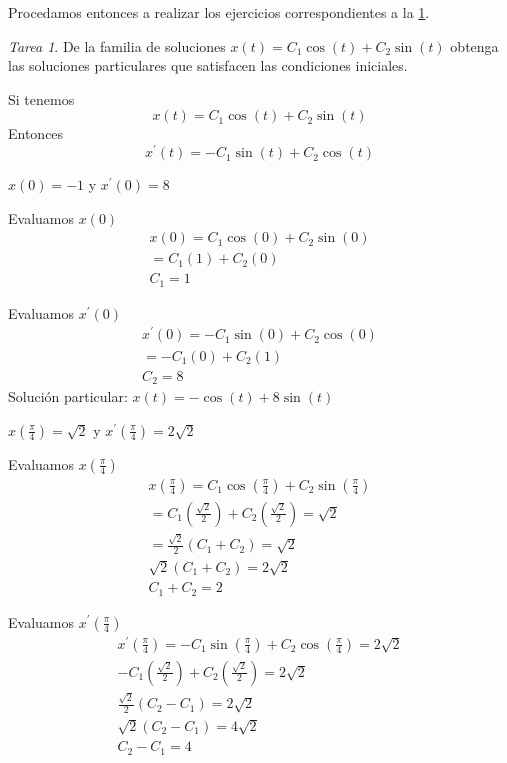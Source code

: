 \documentclass[12pt]{article} %
\theoremstyle{remark} %
\newtheorem{tarea}{Tarea}[section] %
\newcounter{ejercicio}[tarea]
\begin{document}
Procedamos entonces a realizar los ejercicios correspondientes a la \cref{tarea:familiaSoluciones}.
\begin{tarea}\label{tarea:familiaSoluciones}
De la familia de soluciones $x(t) = C_1 \cos(t) + C_2 \sin(t)$ obtenga las 
soluciones particulares que satisfacen las condiciones iniciales.

Si tenemos \[ x(t) = C_1 \cos(t) + C_2 \sin(t) \]
Entonces \[ x^{\prime}(t) = -C_1 \sin(t) + C_2 \cos(t) \]
\begin{ejercicio}
  $x(0) = -1$ y $x^{\prime}(0) = 8$

  Evaluamos $x(0)$
  \begin{gather*}
    x(0) = C_1 \cos(0) + C_2 \sin(0)\\
    = C_1(1) + C_2(0)\\
    C_1  = 1
  \end{gather*}

  Evaluamos $x^{\prime}(0)$
  \begin{gather*}
    x^{\prime}(0) = -C_1 \sin(0) + C_2 \cos(0)\\
    = -C_1(0) + C_2(1)\\
    C_2 = 8
  \end{gather*}
  Solución particular: $x(t) = - \cos(t) + 8 \sin(t)$

\end{ejercicio}
\begin{ejercicio}
  $x(\frac{\pi}{4}) = \sqrt{2}$ y $x^{\prime}(\frac{\pi}{4}) = 2 \sqrt{2}$

  Evaluamos $x(\frac{\pi}{4})$
  \begin{gather*}
    x(\frac{\pi}{4}) = C_1 \cos(\frac{\pi}{4}) + C_2 \sin(\frac{\pi}{4})\\
    = C_1 (\frac{\sqrt{2}}{2}) + C_2 (\frac{\sqrt{2}}{2}) = \sqrt{2}\\
    = \frac{\sqrt{2}}{2}(C_1 + C_2) = \sqrt{2}\\
    \sqrt{2}(C_1 + C_2) = 2 \sqrt{2}\\
    C_1 + C_2 = 2
  \end{gather*}

  Evaluamos $x^{\prime}(\frac{\pi}{4})$
  \begin{gather*}
    x^{\prime}(\frac{\pi}{4}) = -C_1 \sin(\frac{\pi}{4}) + C_2 \cos(\frac{\pi}{4}) = 2 \sqrt{2}\\
    -C_1 (\frac{\sqrt{2}}{2}) + C_2 (\frac{\sqrt{2}}{2}) = 2 \sqrt{2}\\
    \frac{\sqrt{2}}{2}(C_2 - C_1) = 2 \sqrt{2}\\
    \sqrt{2}(C_2 - C_1) = 4 \sqrt{2}\\
    C_2 - C_1 = 4
  \end{gather*}


\end{ejercicio}
\end{tarea}
\end{document}
